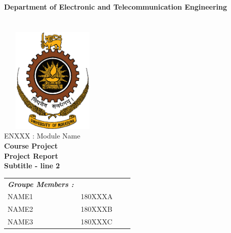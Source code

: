 \documentclass[12pt,a4paper]{article}
\begin{document}
\begin{titlepage}


\center %

\fontsize{16pt}{12} \textbf{ Department of Electronic and Telecommunication Engineering}\\ [0.2cm]
\fontsize{16pt}{12}\selectfont {UNIVERSITY OF MORATUWA}\\[0.2cm] %

\fontsize{16pt}{12}\selectfont {Faculty of Engineering}\\[0.3cm] %
\vspace{2cm}
\includegraphics[width=2in,height=2in,keepaspectratio]{logo.png}\\[1cm] %


\fontsize{16pt}{12}\selectfont ENXXX : Module Name\\[0.5cm]
\fontsize{18pt}{12}\selectfont \textbf{Course Project}\\[1.5cm]
\fontsize{18pt}{12}\selectfont \textbf{Project Report}\\[3pt] 
\fontsize{18pt}{12}\selectfont \textbf{Subtitle - line 2}\\[0.5cm]
\vspace{1cm}
\fontsize{14pt}{12}\selectfont
%
\begin{tabular}{ l l l l}
\textbf{\textit{Groupe Members :}} \\[3pt]
\hspace{5mm}NAME1  & 180XXXA & \hspace{20mm}\\[2pt]
\hspace{5mm}NAME2 & 180XXXB & \hspace{20mm} \\[2pt]
\hspace{5mm}NAME3  & 180XXXC & \hspace{20mm} \\[2pt]
  

\end{tabular}
\end{titlepage}
\end{document}

